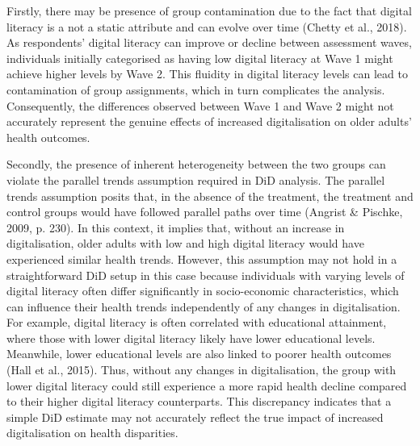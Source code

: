 Firstly, there may be presence of group contamination due to the fact that digital literacy is a not a static attribute and can evolve over time (Chetty et al., 2018). As respondents' digital literacy can improve or decline between assessment waves, individuals initially categorised as having low digital literacy at Wave 1 might achieve higher levels by Wave 2. This fluidity in digital literacy levels can lead to contamination of group assignments, which in turn complicates the analysis. Consequently, the differences observed between Wave 1 and Wave 2 might not accurately represent the genuine effects of increased digitalisation on older adults' health outcomes.

Secondly, the presence of inherent heterogeneity between the two groups can violate the parallel trends assumption required in DiD analysis. The parallel trends assumption posits that, in the absence of the treatment, the treatment and control groups would have followed parallel paths over time (Angrist \& Pischke, 2009, p. 230). In this context, it implies that, without an increase in digitalisation, older adults with low and high digital literacy would have experienced similar health trends. However, this assumption may not hold in a straightforward DiD setup in this case because individuals with varying levels of digital literacy often differ significantly in socio-economic characteristics, which can influence their health trends independently of any changes in digitalisation. For example, digital literacy is often correlated with educational attainment, where those with lower digital literacy likely have lower educational levels. Meanwhile, lower educational levels are also linked to poorer health outcomes (Hall et al., 2015). Thus, without any changes in digitalisation, the group with lower digital literacy could still experience a more rapid health decline compared to their higher digital literacy counterparts. This discrepancy indicates that a simple DiD estimate may not accurately reflect the true impact of increased digitalisation on health disparities. 
